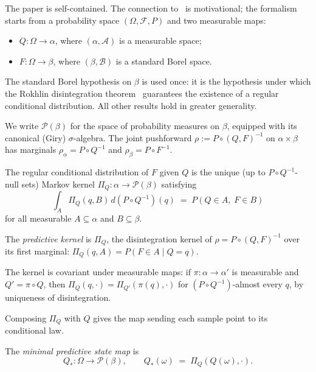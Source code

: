 The paper is self-contained.  The connection to~\cite{mahon_paper1} is
motivational; the formalism starts from a probability space
$(\Omega, \mathcal{F}, P)$ and two measurable maps:
\begin{itemize}
  \item $Q : \Omega \to \alpha$, where $(\alpha, \mathcal{A})$ is a measurable
    space;
  \item $F : \Omega \to \beta$, where $(\beta, \mathcal{B})$ is a standard
    Borel space.
\end{itemize}
The standard Borel hypothesis on $\beta$ is used once: it is the hypothesis
under which the Rokhlin disintegration theorem~\cite{Rokhlin1952} guarantees the
existence of a regular conditional distribution.  All other results hold in
greater generality.

We write $\mathcal{P}(\beta)$ for the space of probability measures on $\beta$,
equipped with its canonical (Giry) $\sigma$-algebra.  The joint pushforward
$\rho := P \circ (Q, F)^{-1}$ on $\alpha \times \beta$ has marginals
$\rho_\alpha = P \circ Q^{-1}$ and $\rho_\beta = P \circ F^{-1}$.

The regular conditional distribution of $F$ given $Q$ is the unique (up to
$P \circ Q^{-1}$-null sets) Markov kernel $\Pi_Q : \alpha \to \mathcal{P}(\beta)$
satisfying
\[
  \int_A \Pi_Q(q, B)\, d(P \circ Q^{-1})(q) \;=\; P(Q \in A,\; F \in B)
\]
for all measurable $A \subseteq \alpha$ and $B \subseteq \beta$.

\begin{definition}
\label{def:predictive-kernel}
The \emph{predictive kernel} is $\Pi_Q$, the disintegration kernel of
$\rho = P \circ (Q, F)^{-1}$ over its first marginal:
$\Pi_Q(q, A) = P(F \in A \mid Q = q)$.
\end{definition}

The kernel is covariant under measurable maps: if $\pi : \alpha \to \alpha'$ is
measurable and $Q' = \pi \circ Q$, then $\Pi_Q(q, \cdot) = \Pi_{Q'}(\pi(q), \cdot)$
for $(P \circ Q^{-1})$-almost every $q$, by uniqueness of disintegration.

Composing $\Pi_Q$ with $Q$ gives the map sending each sample point to its
conditional law.

\begin{definition}
\label{def:minimal-predictive}
The \emph{minimal predictive state map} is
\[
  Q_* : \Omega \to \mathcal{P}(\beta), \qquad Q_*(\omega) \;=\; \Pi_Q(Q(\omega), \cdot).
\]
\end{definition}

